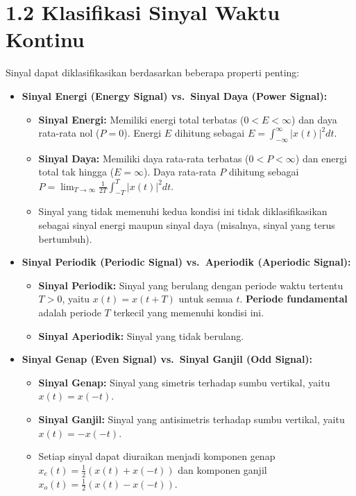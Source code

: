 \documentclass[
  letterpaper,
  DIV=11,
  numbers=noendperiod]{scrreprt}
\providecommand{\tightlist}{%
  \setlength{\itemsep}{0pt}\setlength{\parskip}{0pt}}
\begin{document}
\section{1.2 Klasifikasi Sinyal Waktu
Kontinu}\label{klasifikasi-sinyal-waktu-kontinu}

Sinyal dapat diklasifikasikan berdasarkan beberapa properti penting:

\begin{itemize}
\item
  \textbf{Sinyal Energi (Energy Signal) vs.~Sinyal Daya (Power Signal):}

  \begin{itemize}
  \tightlist
  \item
    \textbf{Sinyal Energi:} Memiliki energi total terbatas
    (\(0 < E < \infty\)) dan daya rata-rata nol (\(P=0\)). Energi \(E\)
    dihitung sebagai \(E = \int_{-\infty}^{\infty} |x(t)|^2 dt\).
  \item
    \textbf{Sinyal Daya:} Memiliki daya rata-rata terbatas
    (\(0 < P < \infty\)) dan energi total tak hingga (\(E=\infty\)).
    Daya rata-rata \(P\) dihitung sebagai
    \(P = \lim_{T \to \infty} \frac{1}{2T} \int_{-T}^{T} |x(t)|^2 dt\).
  \item
    Sinyal yang tidak memenuhi kedua kondisi ini tidak diklasifikasikan
    sebagai sinyal energi maupun sinyal daya (misalnya, sinyal yang
    terus bertumbuh).
  \end{itemize}
\item
  \textbf{Sinyal Periodik (Periodic Signal) vs.~Aperiodik (Aperiodic
  Signal):}

  \begin{itemize}
  \tightlist
  \item
    \textbf{Sinyal Periodik:} Sinyal yang berulang dengan periode waktu
    tertentu \(T > 0\), yaitu \(x(t) = x(t+T)\) untuk semua \(t\).
    \textbf{Periode fundamental} adalah periode \(T\) terkecil yang
    memenuhi kondisi ini.
  \item
    \textbf{Sinyal Aperiodik:} Sinyal yang tidak berulang.
  \end{itemize}
\item
  \textbf{Sinyal Genap (Even Signal) vs.~Sinyal Ganjil (Odd Signal):}

  \begin{itemize}
  \tightlist
  \item
    \textbf{Sinyal Genap:} Sinyal yang simetris terhadap sumbu vertikal,
    yaitu \(x(t) = x(-t)\).
  \item
    \textbf{Sinyal Ganjil:} Sinyal yang antisimetris terhadap sumbu
    vertikal, yaitu \(x(t) = -x(-t)\).
  \item
    Setiap sinyal dapat diuraikan menjadi komponen genap
    \(x_e(t) = \frac{1}{2}(x(t) + x(-t))\) dan komponen ganjil
    \(x_o(t) = \frac{1}{2}(x(t) - x(-t))\).
  \end{itemize}
\end{itemize}
\end{document}

